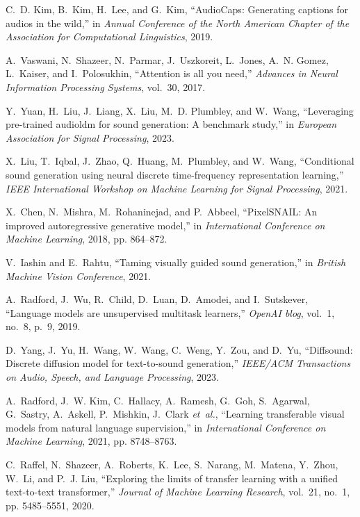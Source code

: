 \documentclass{article}
\def\L{{\cal L}}
\begin{document}
\begin{thebibliography}{10}
C.~D. Kim, B.~Kim, H.~Lee, and G.~Kim, ``{AudioCaps}: Generating captions for audios in the wild,'' in \emph{Annual Conference of the North American Chapter of the Association for Computational Linguistics}, 2019.

A.~Vaswani, N.~Shazeer, N.~Parmar, J.~Uszkoreit, L.~Jones, A.~N. Gomez, {\L}.~Kaiser, and I.~Polosukhin, ``Attention is all you need,'' \emph{Advances in Neural Information Processing Systems}, vol.~30, 2017.

Y.~Yuan, H.~Liu, J.~Liang, X.~Liu, M.~D. Plumbley, and W.~Wang, ``Leveraging pre-trained audioldm for sound generation: A benchmark study,'' in \emph{European Association for Signal Processing}, 2023.

X.~Liu, T.~Iqbal, J.~Zhao, Q.~Huang, M.~Plumbley, and W.~Wang, ``Conditional sound generation using neural discrete time-frequency representation learning,'' \emph{IEEE International Workshop on Machine Learning for Signal Processing}, 2021.

X.~Chen, N.~Mishra, M.~Rohaninejad, and P.~Abbeel, ``{PixelSNAIL}: An improved autoregressive generative model,'' in \emph{International Conference on Machine Learning}, 2018, pp. 864--872.

V.~Iashin and E.~Rahtu, ``Taming visually guided sound generation,'' in \emph{British Machine Vision Conference}, 2021.

A.~Radford, J.~Wu, R.~Child, D.~Luan, D.~Amodei, and I.~Sutskever, ``Language models are unsupervised multitask learners,'' \emph{OpenAI blog}, vol.~1, no.~8, p.~9, 2019.

D.~Yang, J.~Yu, H.~Wang, W.~Wang, C.~Weng, Y.~Zou, and D.~Yu, ``Diffsound: Discrete diffusion model for text-to-sound generation,'' \emph{IEEE/ACM Transactions on Audio, Speech, and Language Processing}, 2023.

A.~Radford, J.~W. Kim, C.~Hallacy, A.~Ramesh, G.~Goh, S.~Agarwal, G.~Sastry, A.~Askell, P.~Mishkin, J.~Clark \emph{et~al.}, ``Learning transferable visual models from natural language supervision,'' in \emph{International Conference on Machine Learning}, 2021, pp. 8748--8763.

C.~Raffel, N.~Shazeer, A.~Roberts, K.~Lee, S.~Narang, M.~Matena, Y.~Zhou, W.~Li, and P.~J. Liu, ``Exploring the limits of transfer learning with a unified text-to-text transformer,'' \emph{Journal of Machine Learning Research}, vol.~21, no.~1, pp. 5485--5551, 2020.


\end{thebibliography}
\end{document}
